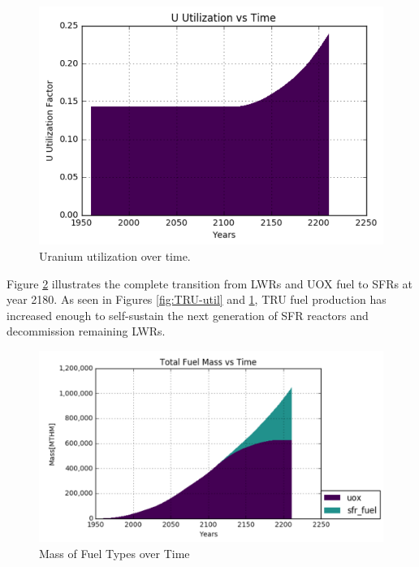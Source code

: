 \begin{figure} [h]
	\includegraphics[width=0.8\linewidth]{images/u-util}
	\caption{Uranium utilization over time.}
	\label{fig:u-util}
\end{figure}

Figure \ref{fig:fuel-mass} illustrates the complete transition from LWRs and UOX fuel to SFRs at year 2180. As seen in Figures \ref{fig:TRU-util} and \ref{fig:u-util}, TRU fuel
production has increased enough to self-sustain the next generation of SFR reactors and decommission remaining LWRs.

\begin{figure}[h]
	\includegraphics[width=\linewidth]{images/transition-fuelmass}
	\caption{Mass of Fuel Types over Time}
	\label{fig:fuel-mass}
\end{figure}